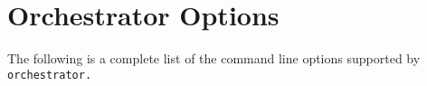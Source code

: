 
\section{Orchestrator Options}
The following is a complete list of the command line options supported by \verb!orchestrator.!

\dlbeg{1.65in}



\dlend


